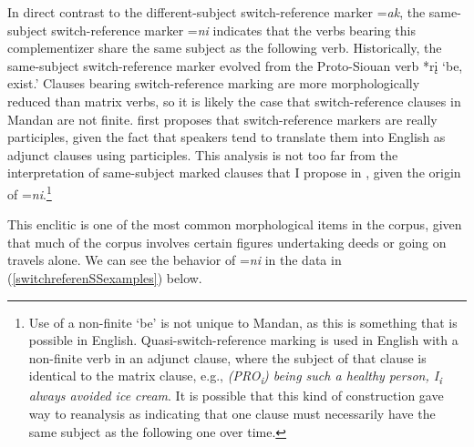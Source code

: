 \label{SecSSmarker}

In direct contrast to the different-subject switch-reference marker =\textit{ak}, the same-subject switch-reference marker =\textit{ni} indicates that the verbs bearing this complementizer share the same subject as the following verb. Historically, the same-subject switch-reference marker evolved from the Proto-Siouan verb *rį `be, exist.' Clauses bearing switch-reference marking are more morphologically reduced than matrix verbs, so it is likely the case that switch-reference clauses in Mandan are not finite. \citet{kennard1936} first proposes that switch-reference markers are really participles, given the fact that speakers tend to translate them into English as adjunct clauses using participles. This analysis is not too far from the interpretation of same-subject marked clauses that I propose in , given the origin of =\textit{ni}.\footnote{Use of a non-finite `be' is not unique to Mandan, as this is something that is possible in English. Quasi-switch-reference marking is used in English with a non-finite verb in an adjunct clause, where the subject of that clause is identical to the matrix clause, e.g., \textit{(PRO\textsubscript{\textit{i}}) being such a healthy person, I\textsubscript{\textit{i}} always avoided ice cream}. It is possible that this kind of construction gave way to reanalysis as indicating that one clause must necessarily have the same subject as the following one over time.}

This enclitic is one of the most common morphological items in the corpus, given that much of the corpus involves certain figures undertaking deeds or going on travels alone. We can see the behavior of =\textit{ni} in the data in (\ref{switchreferenSSexamples}) below.

